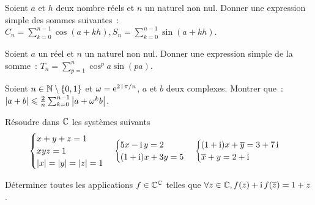 \begin{exercice}
  Soient \(a\) et \(h\) deux nombre réels et \(n\) un naturel non nul. Donner 
  une expression simple des sommes suivantes~: \( C_n = \sum_{k = 0}^{n-1} 
  \cos(a + kh), S_n = \sum_{k = 0}^{n-1} \sin(a + kh)\).
\end{exercice}

\begin{exercice}
  Soient \(a\) un réel et \(n\) un naturel non nul. Donner une expression 
  simple de la somme~: \(T_n = \sum_{p = 1}^n \cos^p a \sin(pa)\).
\end{exercice}

\begin{exercice}
  Soient \(n \in \mathbb{N}\setminus\{0,1\}\) et \(\omega = \operatorname{e}^{2\operatorname{i}\pi/n}\), \(a\) et 
  \(b\) deux complexes. Montrer que~: \(\left\lvert a + b\right\rvert \leqslant \frac{2}{n} 
  \sum_{k = 0}^{n-1} \left\lvert a + \omega^k b\right\rvert\).
\end{exercice}

\begin{exercice}
  Résoudre dans \(\mathbb{C}\) les systèmes suivants
  \begin{equation}
    \begin{cases} x + y + z = 1 \\ xyz = 1 \\ \left\lvert x\right\rvert = \left\lvert y\right\rvert = \left\lvert z\right\rvert = 
    1 \end{cases}
    \begin{cases} 5x-\operatorname{i}{}y = 2 \\ (1 + \operatorname{i})x + 3y = 5 \end{cases}
      \begin{cases} (1 + \operatorname{i})x + \overline{y} = 3 + 7\operatorname{i} \\\overline{x} + y = 2 + 
      \operatorname{i}\end{cases}
  \end{equation}
\end{exercice}

\begin{exercice}
  Déterminer toutes les applications \(f \in \mathbb{C}^{\mathbb{C}}\) telles que \(\forall z 
  \in \mathbb{C}, f(z) + \operatorname{i} f(\overline{z}) = 1 + z\).
\end{exercice}

